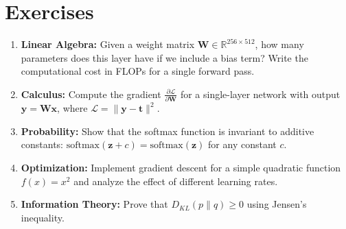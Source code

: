 
\section{Exercises}

\begin{enumerate}
    \item \textbf{Linear Algebra:} Given a weight matrix $\mathbf{W} \in \mathbb{R}^{256 \times 512}$, how many parameters does this layer have if we include a bias term? Write the computational cost in FLOPs for a single forward pass.
    
    \item \textbf{Calculus:} Compute the gradient $\frac{\partial \mathcal{L}}{\partial \mathbf{W}}$ for a single-layer network with output $\mathbf{y} = \mathbf{W}\mathbf{x}$, where $\mathcal{L} = \|\mathbf{y} - \mathbf{t}\|^2$.
    
    \item \textbf{Probability:} Show that the softmax function is invariant to additive constants: $\text{softmax}(\mathbf{z} + c) = \text{softmax}(\mathbf{z})$ for any constant $c$.
    
    \item \textbf{Optimization:} Implement gradient descent for a simple quadratic function $f(x) = x^2$ and analyze the effect of different learning rates.
    
    \item \textbf{Information Theory:} Prove that $D_{KL}(p \| q) \geq 0$ using Jensen's inequality.
\end{enumerate}
